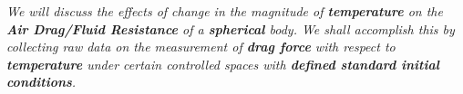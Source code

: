 \textit{We will discuss the effects of change in the magnitude of \textbf{temperature} on the \textbf{Air Drag/Fluid Resistance} of a \textbf{spherical} body. We shall accomplish this by collecting raw data on the measurement of \textbf{drag force} with respect to \textbf{temperature} under certain controlled spaces with \textbf{defined standard initial conditions}.}
